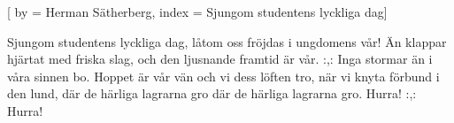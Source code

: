 

[ 
by = {Herman Sätherberg},
index = {Sjungom studentens lyckliga dag}]

\beginverse* 
Sjungom studentens lyckliga dag,
låtom oss fröjdas i ungdomens vår!
Än klappar hjärtat med friska slag,
och den ljusnande framtid är vår.
:,: Inga stormar än 
i våra sinnen bo.
Hoppet är vår vän 
och vi dess löften tro,
när vi knyta förbund i den lund,
där de härliga lagrarna gro
där de härliga lagrarna gro.
Hurra! :,:
Hurra!
\endverse
\endsong
